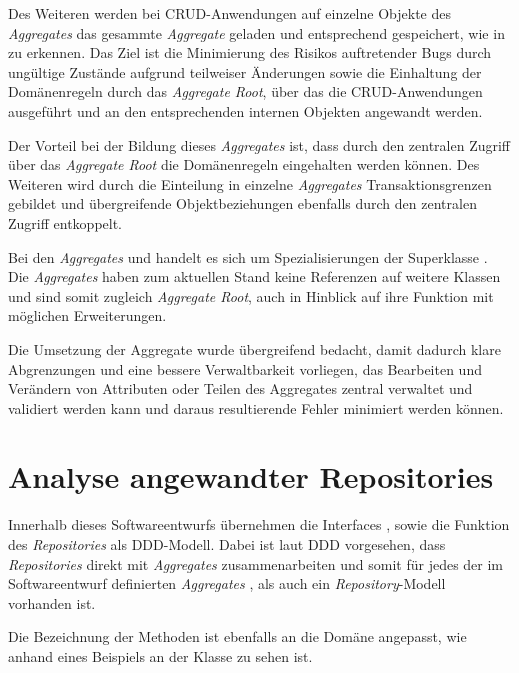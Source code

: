 Des Weiteren werden bei \ac{CRUD}-Anwendungen auf einzelne Objekte des \textit{Aggregates} das gesammte \textit{Aggregate} geladen und entsprechend gespeichert, wie in \href{}{} zu erkennen.
Das Ziel ist die Minimierung des Risikos auftretender Bugs durch ungültige Zustände aufgrund teilweiser Änderungen sowie die Einhaltung der Domänenregeln durch das \textit{Aggregate Root}, über das die \ac{CRUD}-Anwendungen ausgeführt und an den entsprechenden internen Objekten angewandt werden.

Der Vorteil bei der Bildung dieses \textit{Aggregates} ist, dass durch den zentralen Zugriff über das \textit{Aggregate Root} die Domänenregeln eingehalten werden können.
Des Weiteren wird durch die Einteilung in einzelne \textit{Aggregates} Transaktionsgrenzen gebildet und übergreifende Objektbeziehungen ebenfalls durch den zentralen Zugriff entkoppelt.

Bei den \textit{Aggregates} \href{}{} und \href{}{} handelt es sich um Spezialisierungen der Superklasse \href{}{}.
Die \textit{Aggregates} haben zum aktuellen Stand keine Referenzen auf weitere Klassen und sind somit zugleich \textit{Aggregate Root}, auch in Hinblick auf ihre Funktion mit möglichen Erweiterungen.

Die Umsetzung der Aggregate wurde übergreifend bedacht, damit dadurch klare Abgrenzungen und eine bessere Verwaltbarkeit vorliegen, das Bearbeiten und Verändern von Attributen oder Teilen des Aggregates zentral verwaltet und validiert werden kann und daraus resultierende Fehler minimiert werden können.

\section{Analyse angewandter Repositories}
\label{domaindrivendesign>repositories}
Innerhalb dieses Softwareentwurfs übernehmen die Interfaces \href{}{}, \href{}{} sowie \href{}{} die Funktion des \textit{Repositories} als \ac{DDD}-Modell.
Dabei ist laut \ac{DDD} vorgesehen, dass \textit{Repositories} direkt mit \textit{Aggregates} zusammenarbeiten und somit für jedes der im Softwareentwurf definierten \textit{Aggregates} \href{}{}, \href{}{} als auch \href{}{} ein \textit{Repository}-Modell vorhanden ist.

Die Bezeichnung der Methoden ist ebenfalls an die Domäne angepasst, wie anhand eines Beispiels an der Klasse \href{}{} zu sehen ist.

